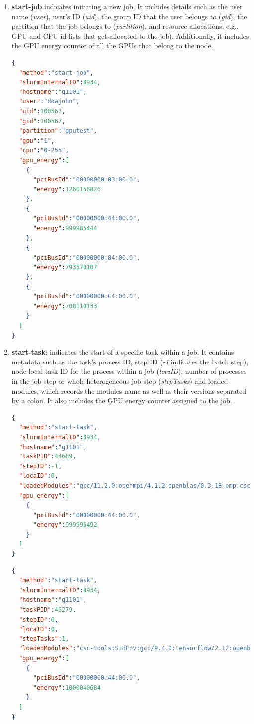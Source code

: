 \begin{enumerate}
    \item \textbf{start-job} indicates initiating a new job. It includes details such as the user name (\textit{user}), user's ID (\textit{uid}), the group ID that the user belongs to (\textit{gid}), the partition that the job belongs to (\textit{partition}), and resource allocations, e.g., GPU and CPU id lists that get allocated to the job). Additionally, it includes the GPU energy counter of all the GPUs that belong to the node.

\begin{lstlisting}[language=JSON]
{
  "method":"start-job",
  "slurmInternalID":8934,
  "hostname":"g1101",
  "user":"dowjohn",
  "uid":100567,
  "gid":100567,
  "partition":"gputest",
  "gpu":"1",
  "cpu":"0-255",
  "gpu_energy":[
    {
      "pciBusId":"00000000:03:00.0",
      "energy":1260156826
    },
    {
      "pciBusId":"00000000:44:00.0",
      "energy":999985444
    },
    {
      "pciBusId":"00000000:84:00.0",
      "energy":793570107
    },
    {
      "pciBusId":"00000000:C4:00.0",
      "energy":708110133
    }
  ]
}
\end{lstlisting}

    \item \textbf{start-task}: indicates the start of a specific task within a job. It contains metadata such as the task's process ID, step ID (\textit{-1} indicates the batch step), node-local task ID for the process within a job (\textit{locaID}), number of processes in the job step or whole heterogeneous job step (\textit{stepTasks}) and loaded modules, which records the modules name as well as their versions separated by a colon. It also includes the GPU energy counter assigned to the job.

\begin{lstlisting}[language=JSON]
{
  "method":"start-task",
  "slurmInternalID":8934,
  "hostname":"g1101",
  "taskPID":44689,
  "stepID":-1,
  "locaID":0,
  "loadedModules":"gcc/11.2.0:openmpi/4.1.2:openblas/0.3.18-omp:csc-tools:StdEnv",
  "gpu_energy":[
    {
      "pciBusId":"00000000:44:00.0",
      "energy":999996492
    }
  ]
}
\end{lstlisting}

\begin{lstlisting}[language=JSON]
{
  "method":"start-task",
  "slurmInternalID":8934,
  "hostname":"g1101",
  "taskPID":45279,
  "stepID":0,
  "locaID":0,
  "stepTasks":1,
  "loadedModules":"csc-tools:StdEnv:gcc/9.4.0:tensorflow/2.12:openblas/0.3.18-omp:openmpi/4.1.2:cuda/11.5.0",
  "gpu_energy":[
    {
      "pciBusId":"00000000:44:00.0",
      "energy":1000040684
    }
  ]
}
\end{lstlisting}


\end{enumerate}
